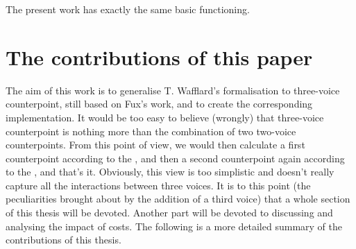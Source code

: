 The present work has exactly the same basic functioning. 


\section{The contributions of this paper}
The aim of this work is to generalise T. Wafflard's formalisation to three-voice counterpoint, still based on Fux's work, and to create the corresponding implementation. It would be too easy to believe (wrongly) that three-voice counterpoint is nothing more than the combination of two two-voice counterpoints. From this point of view, we would then calculate a first counterpoint according to the \cf, and then a second counterpoint again according to the \cf, and that's it. Obviously, this view is too simplistic and doesn't really capture all the interactions between three voices. It is to this point (the peculiarities brought about by the addition of a third voice) that a whole section of this thesis will be devoted. Another part will be devoted to discussing and analysing the impact of costs. The following is a more detailed summary of the contributions of this thesis. 
